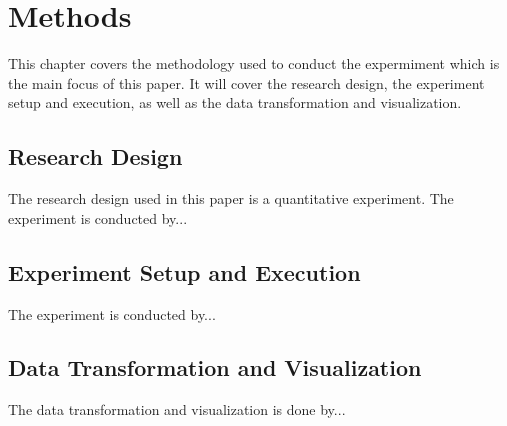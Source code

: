 \section{Methods}
This chapter covers the methodology used to conduct the expermiment which is the main focus of this paper.
It will cover the research design, the experiment setup and execution, as well as the data transformation 
and visualization.

\subsection{Research Design}
The research design used in this paper is a quantitative experiment. The experiment is conducted by...

\subsection{Experiment Setup and Execution}
The experiment is conducted by...

\subsection{Data Transformation and Visualization}
The data transformation and visualization is done by...

